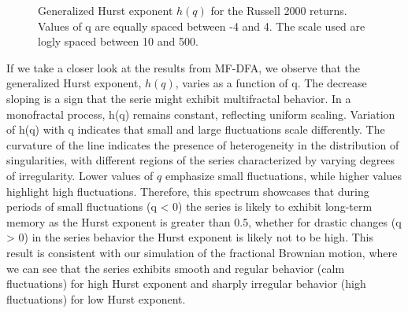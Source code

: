 \documentclass[11pt]{extarticle}
\begin{document}
\begin{figure}[htbp]
    \centering
    \caption{Generalized Hurst exponent $h(q)$ for the Russell 2000 returns. Values of q are equally spaced between -4 and 4.
    The scale used are logly spaced between 10 and 500.}
\end{figure}

\FloatBarrier


If we take a closer look at the results from MF-DFA, we observe that the generalized Hurst exponent, $h(q)$,
varies as a function of q. The decrease sloping is a sign that the serie might exhibit multifractal behavior.
In a monofractal process, h(q) remains constant, reflecting uniform scaling.
Variation of h(q) with q indicates that small and large fluctuations scale differently.
The curvature of the line indicates the presence of heterogeneity in the distribution of singularities, with
different regions of the series characterized by varying degrees of irregularity.
Lower values of $q$ emphasize small fluctuations, while higher values highlight high fluctuations.
Therefore, this spectrum showcases that during periods of small fluctuations (q < 0) the series is likely to exhibit long-term
memory as the Hurst exponent is greater than 0.5, whether for drastic changes (q > 0) in the series behavior the Hurst exponent
is likely not to be high.
This result is consistent with our simulation of the fractional Brownian motion, where we can see that the
series exhibits smooth and regular behavior (calm fluctuations) for high Hurst exponent and sharply irregular behavior
(high fluctuations) for low Hurst exponent.
\end{document}
